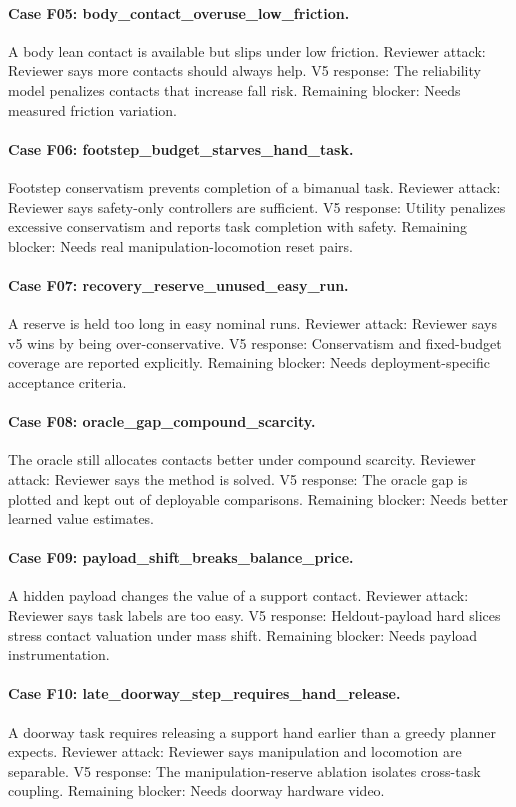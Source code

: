 \documentclass{article}
\begin{document}
\paragraph{Case F05: body\_contact\_overuse\_low\_friction.} A body lean contact is available but slips under low friction. Reviewer attack: Reviewer says more contacts should always help. V5 response: The reliability model penalizes contacts that increase fall risk. Remaining blocker: Needs measured friction variation.
\paragraph{Case F06: footstep\_budget\_starves\_hand\_task.} Footstep conservatism prevents completion of a bimanual task. Reviewer attack: Reviewer says safety-only controllers are sufficient. V5 response: Utility penalizes excessive conservatism and reports task completion with safety. Remaining blocker: Needs real manipulation-locomotion reset pairs.
\paragraph{Case F07: recovery\_reserve\_unused\_easy\_run.} A reserve is held too long in easy nominal runs. Reviewer attack: Reviewer says v5 wins by being over-conservative. V5 response: Conservatism and fixed-budget coverage are reported explicitly. Remaining blocker: Needs deployment-specific acceptance criteria.
\paragraph{Case F08: oracle\_gap\_compound\_scarcity.} The oracle still allocates contacts better under compound scarcity. Reviewer attack: Reviewer says the method is solved. V5 response: The oracle gap is plotted and kept out of deployable comparisons. Remaining blocker: Needs better learned value estimates.
\paragraph{Case F09: payload\_shift\_breaks\_balance\_price.} A hidden payload changes the value of a support contact. Reviewer attack: Reviewer says task labels are too easy. V5 response: Heldout-payload hard slices stress contact valuation under mass shift. Remaining blocker: Needs payload instrumentation.
\paragraph{Case F10: late\_doorway\_step\_requires\_hand\_release.} A doorway task requires releasing a support hand earlier than a greedy planner expects. Reviewer attack: Reviewer says manipulation and locomotion are separable. V5 response: The manipulation-reserve ablation isolates cross-task coupling. Remaining blocker: Needs doorway hardware video.
\end{document}
